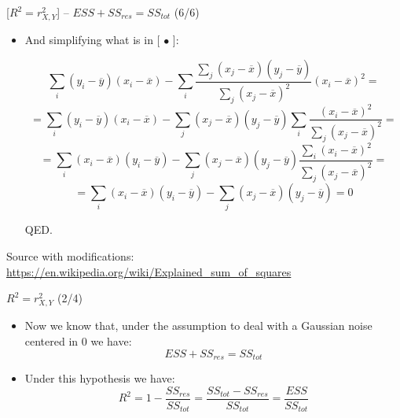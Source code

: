 \documentclass{beamer}
\begin{document}
\begin{frame}
{\centerline{ [$R^2 = r_{X,Y}^2$] -- $ESS + SS_{res} = SS_{tot} $ (6/6)}}

\begin{itemize}
\item And simplifying what is in [ $\bullet$ ]:

$$ \sum_i (y_{i}-{\overline {y}}) (x_i - \overline{x}) -
\sum_i{{\frac {\sum _{j}(x_{j}-{\overline {x}})(y_{j}-{\overline {y}})}{\sum _{j}(x_{j}-{\overline {x}})^{2}}}
}(x_{i}-{\overline {x}})^2 = $$
$$=  \sum_i (y_{i}-{\overline {y}}) (x_i - \overline{x}) -
\sum _{j}(x_{j}-{\overline {x}})(y_{j}-{\overline {y}})\sum_i{{\frac {(x_{i}-{\overline {x}})^2}{\sum _{j}(x_{j}-{\overline {x}})^{2}}}
}= $$
$$=  \sum_i (x_i - \overline{x}) (y_{i}-{\overline {y}})  -
\sum _{j}(x_{j}-{\overline {x}})(y_{j}-{\overline {y}}){\frac {\sum_i{(x_{i}-{\overline {x}})^2}}{\sum _{j}(x_{j}-{\overline {x}})^{2}}} = $$
$$=  \sum_i (x_i - \overline{x}) (y_{i}-{\overline {y}})  -
\sum _{j}(x_{j}-{\overline {x}})(y_{j}-{\overline {y}}) = 0 $$


QED.


\end{itemize}

\begin{center}
\tiny 
Source with modifications: \url{https://en.wikipedia.org/wiki/Explained_sum_of_squares}
\end{center}

\end{frame}


\begin{frame}
{\centerline{$R^2 = r_{X,Y}^2$ (2/4)}}
\begin{itemize}
\item Now we know that, under the assumption to deal with a Gaussian noise centered in 0 we have:
$$ESS + SS_{res} = SS_{tot} $$
\item Under this hypothesis we have:
$$R^2 = 1 - \frac{SS_{res}}{SS_{tot}} = \frac{SS_{tot}-SS_{res}}{SS_{tot}} = \frac{ESS}{SS_{tot}} $$
\end{itemize}

\end{frame}
\end{document}
